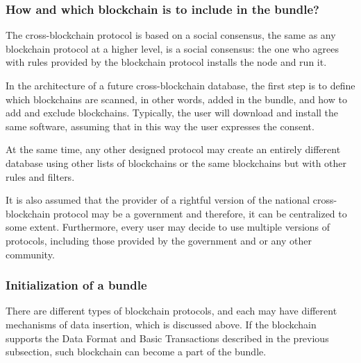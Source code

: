 \begin{multicols}{2}
\vspace{-.3cm}

\subsubsection{How and which blockchain is to include in the bundle?}\label{subsubsec-4.2.a}

\vspace{-.3cm}

The cross-blockchain protocol is based on a social consensus, the same as any blockchain protocol at a higher level, is a social consensus: the one who agrees with rules provided by the blockchain protocol installs the node and run it.

\vspace{-.1cm}

In the architecture of a future cross-blockchain database, the first step is to define which blockchains are scanned, in other words, added in the bundle, and how to add and exclude blockchains. Typically, the user will download and install the same software, assuming that in this way the user expresses the consent.

\vspace{-.1cm}

At the same time, any other designed protocol may create an entirely different database using other lists of blockchains or the same blockchains but with other rules and filters.

\vspace{-.1cm}

It is also assumed that the provider of a rightful version of the national cross-blockchain protocol may be a government and therefore, it can be centralized to some extent. Furthermore, every user may decide to use multiple versions of protocols, including those provided by the government and or any other community.

\vspace{-.7cm}

\subsubsection{Initialization of a bundle}\label{subsubsec-4.2.b}

\vspace{-.3cm}

There are different types of blockchain protocols, and each may have different mechanisms of data insertion, which is discussed above. If the blockchain supports the Data Format and Basic Transactions described in the previous subsection, such blockchain can become a part of the bundle.


\end{multicols}
